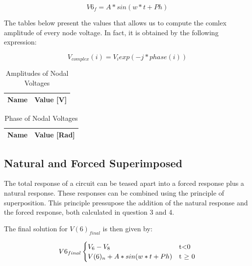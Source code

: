 \begin{equation}
V6_f=A*sin(w*t+Ph)
\end{equation} 

\par The tables below present the values that allows us to compute the comlex amplitude of every node voltage. In fact, it is obtained by the following expression: 

\begin{equation}
V_{complex}(i)=V_i exp(-j*phase(i))
\end{equation} 


\begin{table}[ht]

  \centering
  \begin{tabular}{|l|r|}
    \hline    
    {\bf Name} & {\bf Value [V]} \\ \hline
    
  \end{tabular}
  \caption{Amplitudes of Nodal Voltages} 
\end{table}


\begin{table}[ht]

  \centering
  \begin{tabular}{|l|r|}
    \hline    
    {\bf Name} & {\bf Value [Rad]} \\ \hline
    
  \end{tabular}
  \caption{Phase of Nodal Voltages} 
\end{table}




\newpage



\subsection{Natural and Forced Superimposed}


The total response of a circuit can be teased apart into a forced response plus a natural response. These responses can be combined using the principle of superposition. This principle pressupose the addition of the natural response and the forced response, both calculated in question 3 and 4.

The final solution for $V(6)_{final}$  is then given by:


\begin{equation}
V6_{final}
\begin{cases}
V_{6}-V_{8} & $t$ < $0$ \\
V(6)_{n} + A*sin(w*t+Ph) & $t $\geq$ 0$
\end{cases}
\label {eq:n2}
\end{equation}




